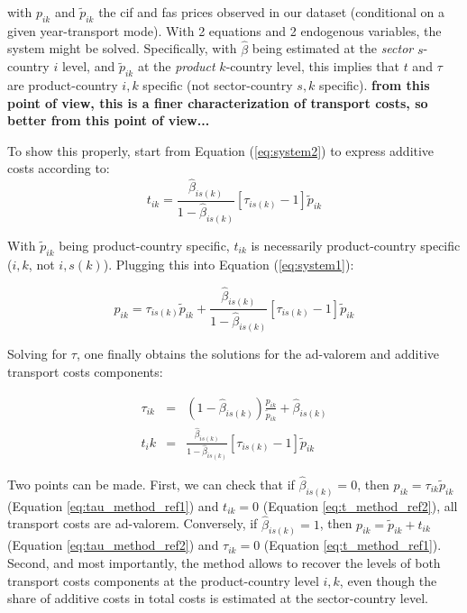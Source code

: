 \documentclass[a4paper,12pt]{article}
\begin{document}
\noindent with $p_{ik}$ and $\widetilde{p}_{ik}$ the cif and fas prices observed in our dataset (conditional on a given year-transport mode). With 2 equations and 2 endogenous variables, the system might be solved. Specifically, with $\widehat{\beta}$ being estimated at the \textit{sector} $s$- country $i$ level, and $\widetilde{p}_{ik}$ at the \textit{product} $k$-country level, this implies that $t$ and $\tau$ are product-country $i,k$ specific (not sector-country $s,k$ specific). \textbf{from this point of view, this is a finer characterization of transport costs, so better from this point of view...}

To show this properly, start from Equation (\ref{eq:system2}) to express additive costs according to:
$$t_{ik} = \frac{ \widehat{\beta}_{is(k)}}{1- \widehat{\beta}_{is(k)}} \left[\tau_{is(k)}-1\right]\widetilde{p}_{ik} $$

With $\widetilde{p}_{ik} $ being product-country specific, $t_{ik}$ is necessarily product-country specific ($i,k$, not $i,s(k)$). Plugging this into Equation (\ref{eq:system1}):

$$p_{ik} = \tau_{is(k)} \widetilde{p}_{ik} + \frac{ \widehat{\beta}_{is(k)}}{1- \widehat{\beta}_{is(k)}} \left[\tau_{is(k)}-1\right]\widetilde{p}_{ik} $$

Solving for $\tau$, one finally obtains the solutions for the ad-valorem and additive transport costs components:

\begin{eqnarray}
\tau_{ik} & =& (1-\widehat{\beta}_{is(k)}) \frac{p_{ik}}{\widetilde{p}_{ik} } + \widehat{\beta}_{is(k)} \label{eq:tau_method_ref1}\\
t_ik &=& \frac{ \widehat{\beta}_{is(k)}}{1- \widehat{\beta}_{is(k)}} \left[\tau_{is(k)}-1\right]\widetilde{p}_{ik} \label{eq:t_method_ref1}
\end{eqnarray}


Two points can be made. First, we can check that if $\widehat{\beta}_{is(k)}=0$, then $p_{ik} = \tau_{ik} \widetilde{p}_{ik}$ (Equation \ref{eq:tau_method_ref1}) and $t_{ik} = 0$ (Equation \ref{eq:t_method_ref2}), all transport costs are ad-valorem. Conversely, if $\widehat{\beta}_{is(k)}=1$, then $p_{ik} = \widetilde{p}_{ik} + t_{ik} $ (Equation \ref{eq:tau_method_ref2}) and $\tau_{ik} = 0$ (Equation \ref{eq:t_method_ref1}). Second, and most importantly, the method allows to recover the levels of both transport costs components at the product-country level $i,k$, even though the share of additive costs in total costs is estimated at the sector-country level.
\end{document}
